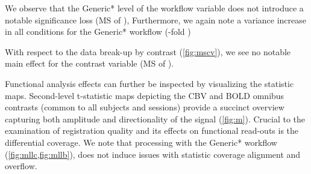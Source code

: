 We observe that the Generic* level of the workflow variable does not introduce a notable significance loss
(MS of ),
Furthermore, we again note a variance increase in all conditions for the Generic* workflow
(-fold
)

With respect to the data break-up by contrast (\cref{fig:mscv}), we see no notable main effect for the contrast variable
(MS of ).

Functional analysis effects can further be inspected by visualizing the statistic maps.
Second-level t-statistic maps depicting the CBV and BOLD omnibus contrasts (common to all subjects and sessions) provide a succinct overview capturing both amplitude and directionality of the signal (\cref{fig:m}).
Crucial to the examination of registration quality and its effects on functional read-outs is the differential coverage.
We note that processing with the Generic* workflow (\cref{fig:mllc,fig:mllb}), does not induce issues with statistic coverage alignment and overflow.


